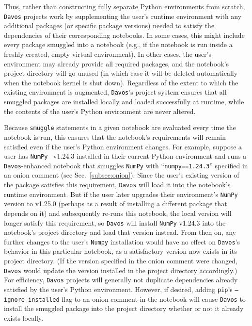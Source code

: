 \documentclass[preprint,12pt,a4paper]{elsarticle}
\begin{document}
Thus, rather than constructing fully separate Python environments from scratch, \texttt{Davos} projects work by supplementing the user's runtime environment with any additional packages (or specific package versions) needed to satisfy the dependencies of their corresponding notebooks.
In some cases, this might include every package smuggled into a notebook (e.g., if the notebook is run inside a freshly created, empty virtual environment).
In other cases, the user's environment may already provide all required packages, and the notebook's project directory will go unused (in which case it will be deleted automatically when the notebook kernel is shut down).
Regardless of the extent to which the existing environment is augmented, \texttt{Davos}'s project system ensures that all smuggled packages are installed locally and loaded successfully at runtime, while the contents of the user's Python environment are never altered.

Because \texttt{smuggle} statements in a given notebook are evaluated every time the notebook is run, this ensures that the notebook's requirements will remain satisfied even if the user's Python environment changes.
For example, suppose a user has \texttt{NumPy}~\cite{HarrEtal20} v1.24.3 installed in their current Python environment and runs a \texttt{Davos}-enhanced notebook that smuggles \texttt{NumPy} with ``\texttt{numpy==1.24.3}'' specified in an onion comment (see Sec.~\ref{subsec:onion}).
Since the user's existing version of the package satisfies this requirement, \texttt{Davos} will load it into the notebook's runtime environment.
But if the user later upgrades their environment's \texttt{NumPy} version to v1.25.0 (perhaps as a result of installing a different package that depends on it) and subsequently re-runs this notebook, the local version will longer satisfy this requirement, so \texttt{Davos} will install \texttt{NumPy} v1.24.3 into the notebook's project directory and load that version instead.
From then on, any further changes to the user's \texttt{Numpy} installation would have no effect on \texttt{Davos}'s behavior in this particular notebook, as a satisfactory version now exists in its project directory.
(If the version specified in the onion comment were changed, \texttt{Davos} would update the version installed in the project directory accordingly.)
For efficiency, \texttt{Davos} projects will generally not duplicate dependencies already satisfied by the user's Python environment.
However, if desired, adding \texttt{pip}'s \texttt{--ignore-installed} flag to an onion comment in the notebook will cause \texttt{Davos} to install the smuggled package into the project directory whether or not it already exists locally.
\end{document}
